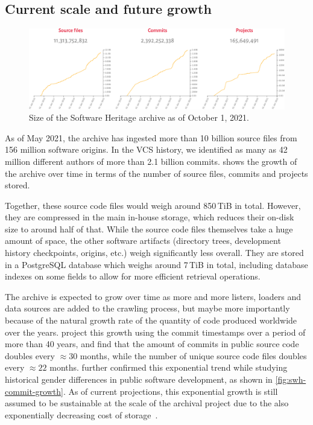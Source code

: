 \subsection{Current scale and future growth}

\begin{figure}
    \centering
    \includegraphics[width=\linewidth]{img/swh-size}
    \caption{Size of the Software Heritage archive as of October 1, 2021.}%
    \label{fig:swh-size}
\end{figure}

As of May 2021, the archive has ingested more than 10 billion source files from
156 million software origins. In the \gls{VCS} history, we identified as many
as 42 million different authors of more than 2.1 billion commits.
 shows the growth of the archive over time in terms of the
number of source files, commits and projects stored.

Together, these source code files would weigh around 850\,TiB in total.
However, they are compressed in the main in-house storage, which reduces their
on-disk size to around half of that. While the
source code files themselves take a huge amount of space, the other software
artifacts (directory trees, development history checkpoints, origins, etc.)
weigh significantly less overall. They are stored in a PostgreSQL database
which weighs around 7\,TiB in total, including database indexes on some fields
to allow for more efficient retrieval operations.

The archive is expected to grow over time as more and more listers,
loaders and data sources are added to the crawling process, but maybe more
importantly because of the natural growth rate of the quantity of code produced
worldwide over the years. \Textcite{swh-provenance-emse}
project this growth using the commit timestamps over a period of more than 40
years, and find that the amount of commits in public source code doubles every
$\approx 30$ months, while the number of unique source code files doubles every
$\approx 22$ months.
\Textcite{ieee-sw-gender-swh} further confirmed this exponential trend while
studying historical gender differences in public software development, as shown
in \cref{fig:swh-commit-growth}. As of current projections, this exponential
growth is still assumed to be sustainable at the scale of the archival project
due to the also exponentially decreasing cost of
storage~\cite{swh-provenance-emse}.

